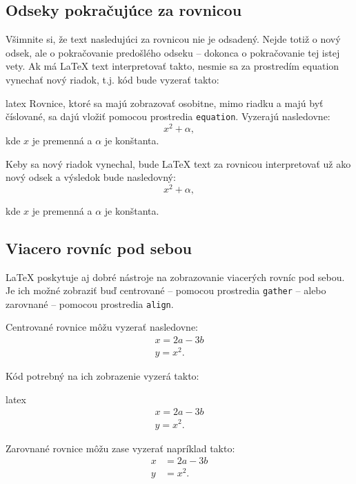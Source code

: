 \subsection{Odseky pokračujúce za rovnicou}

Všimnite si, že text nasledujúci za rovnicou nie je odsadený. Nejde totiž o nový odsek, ale o pokračovanie predošlého odseku -- dokonca o pokračovanie tej istej vety. Ak má LaTeX text interpretovať takto, nesmie sa za prostredím equation vynechať nový riadok, t.j. kód bude vyzerať takto:
\begin{inlinecode}[breaklines=True]{latex}
Rovnice, ktoré sa majú zobrazovať osobitne, mimo riadku a majú byť číslované, sa dajú vložiť pomocou prostredia \texttt{equation}. Vyzerajú nasledovne:
\begin{equation}
x^2 + \alpha,
\end{equation}
kde $x$ je premenná a $\alpha$ je konštanta.
\end{inlinecode}

Keby sa nový riadok vynechal, bude LaTeX text za rovnicou interpretovať už ako nový odsek a výsledok bude nasledovný:
\begin{equation}
x^2 + \alpha,
\end{equation}
	
kde $x$ je premenná a $\alpha$ je konštanta.

\subsection{Viacero rovníc pod sebou}

LaTeX poskytuje aj dobré nástroje na zobrazovanie viacerých rovníc pod sebou. Je ich možné zobraziť buď centrované -- pomocou prostredia \texttt{gather} -- alebo zarovnané -- pomocou prostredia \texttt{align}.

Centrované rovnice môžu vyzerať nasledovne:
\begin{gather}
x = 2a - 3b \\
y = x^2.
\end{gather}

Kód potrebný na ich zobrazenie vyzerá takto:
\begin{inlinecode}[breaklines=True]{latex}
\begin{gather}
x = 2a - 3b \\
y = x^2.
\end{gather}
\end{inlinecode}

Zarovnané rovnice môžu zase vyzerať napríklad takto:
\begin{align}
x &= 2a - 3b \\
y &= x^2.
\end{align}

